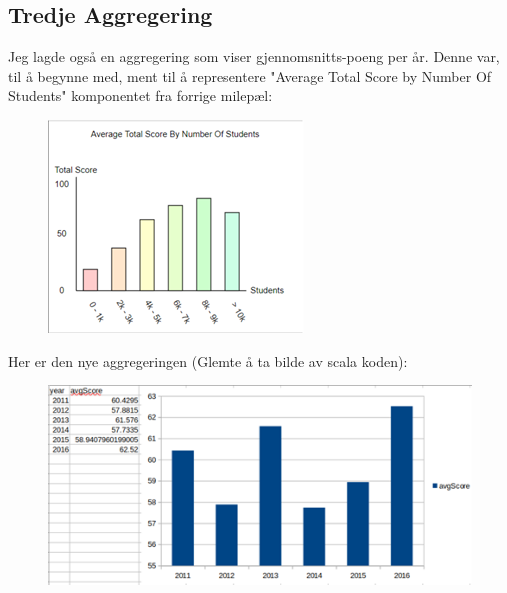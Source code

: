 \subsection{Tredje Aggregering}

Jeg lagde også en aggregering som viser gjennomsnitts-poeng per år. Denne var, til å begynne med, ment til å representere "Average Total Score by Number Of Students" komponentet fra forrige milepæl:

\FigureCounter
\begin{figure}[H]
    \includegraphics[width=\textwidth]{images/milepael5/avgScoreTotStudents.png}
\end{figure}

Her er den nye aggregeringen (Glemte å ta bilde av scala koden):

\FigureCounter
\begin{figure}[H]
    \includegraphics[width=\textwidth]{images/milepael5/avgScoreTotStudentsActual.png}
\end{figure}

